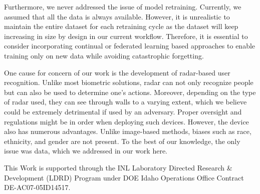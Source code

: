 \documentclass{article}
\begin{document}
Furthermore, we never addressed the issue of model retraining. Currently, we assumed that all the data is always available. However, it is unrealistic to maintain the entire dataset for each retraining cycle as the dataset will keep increasing in size by design in our current workflow. Therefore, it is essential to consider incorporating continual or federated learning based approaches to enable training only on new data while avoiding catastrophic forgetting. 

One cause for concern of our work is the development of radar-based user recognition. Unlike most biometric solutions, radar can not only recognize people but can also be used to determine one's actions. Moreover, depending on the type of radar used, they can see through walls to a varying extent, which we believe could be extremely detrimental if used by an adversary. Proper oversight and regulations might be in order when deploying such devices. However, the device also has numerous advantages. Unlike image-based methods, biases such as race, ethnicity, and gender are not present. To the best of our knowledge, the only issue was data, which we addressed in our work here. 

\begin{ack}
This Work is supported through the INL Laboratory Directed Research \& Development (LDRD) Program under DOE Idaho Operations Office Contract DE-AC07-05ID14517.
\end{ack}


\end{document}
